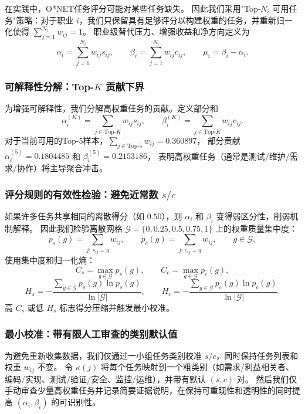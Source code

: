在实践中，O*NET任务评分可能对某些任务缺失。
因此我们采用"Top-$N_i$ 可用任务"策略：对于职业 $i$，我们只保留具有足够评分以构建权重的任务，并重新归一化使得 $\sum_{j=1}^{N_i} w_{ij}=1$。
职业级替代压力、增强收益和净方向定义为
\begin{equation}
    \alpha_i=\sum_{j=1}^{N_i} w_{ij} s_{ij},\qquad
    \beta_i=\sum_{j=1}^{N_i} w_{ij} c_{ij},\qquad
    \mu_i=\beta_i-\alpha_i.
\end{equation}

\subsubsection{可解释性分解：Top-$K$ 贡献下界}

为增强可解释性，我们分解高权重任务的贡献。定义部分和
\begin{equation}
    \alpha_i^{(K)}=\sum_{j\in \text{Top-}K} w_{ij}s_{ij},\qquad
    \beta_i^{(K)}=\sum_{j\in \text{Top-}K} w_{ij}c_{ij}.
\end{equation}
对于当前可用的Top-5样本，$\sum_{j\in \text{Top-}5} w_{ij}=0.360897$，
部分贡献 $\alpha_i^{(5)}=0.1804485$ 和 $\beta_i^{(5)}=0.2153186$，
表明高权重任务（通常是测试/维护/需求/协作）将主导聚合冲击。

\subsubsection{评分规则的有效性检验：避免近常数 $s/c$}

如果许多任务共享相同的离散得分（如 $0.50$），则 $\alpha_i$ 和 $\beta_i$ 变得弱区分性，削弱机制解释。
因此我们检验离散网格 $\mathcal{G}=\{0,0.25,0.5,0.75,1\}$ 上的权重质量集中度：
\begin{equation}
    p_s(g)=\sum_{j:\,s_{ij}=g} w_{ij},\qquad
    p_c(g)=\sum_{j:\,c_{ij}=g} w_{ij},\qquad g\in\mathcal{G},
\end{equation}
使用集中度和归一化熵：
\begin{equation}
    C_s=\max_{g\in\mathcal{G}} p_s(g),\qquad
    C_c=\max_{g\in\mathcal{G}} p_c(g),
\end{equation}
\begin{equation}
    H_s=-\frac{\sum_{g\in\mathcal{G}} p_s(g)\ln p_s(g)}{\ln|\mathcal{G}|},\qquad
    H_c=-\frac{\sum_{g\in\mathcal{G}} p_c(g)\ln p_c(g)}{\ln|\mathcal{G}|}.
\end{equation}
高 $C_s$ 或低 $H_s$ 标志得分压缩并触发最小校准。

\subsubsection{最小校准：带有限人工审查的类别默认值}

为避免重新收集数据，我们仅通过一小组任务类别校准 $s/c$，同时保持任务列表和权重 $w_{ij}$ 不变。
令 $\kappa(j)$ 将每个任务映射到一个粗类别（如需求/利益相关者、编码/实现、测试/验证/安全、监控/运维），并带有默认 $(s,c)$ 对。
然后我们仅手动审查少量高权重任务并记录简要证据说明，在保持可重现性和透明性的同时提高 $(\alpha_i,\beta_i)$ 的可识别性。

